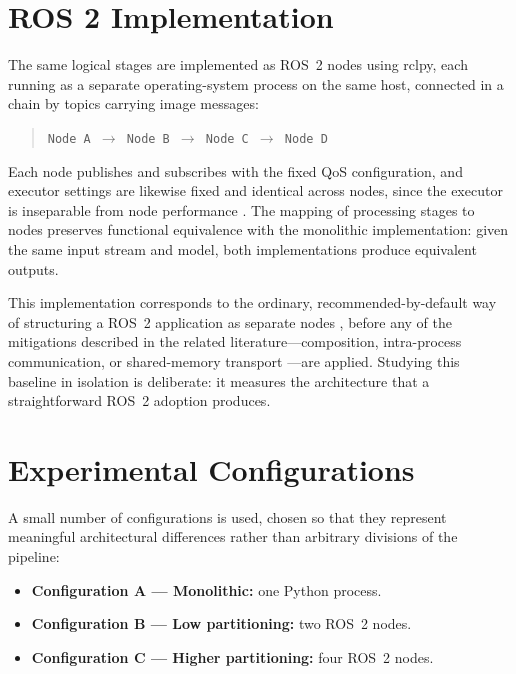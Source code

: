\section{ROS 2 Implementation}
\label{sec:ros2-implementation}

The same logical stages are implemented as ROS~2 nodes using rclpy, each
running as a separate operating-system process on the same host, connected
in a chain by topics carrying image messages:

\begin{quote}
\texttt{Node A $\rightarrow$ Node B $\rightarrow$ Node C $\rightarrow$
Node D}
\end{quote}

Each node publishes and subscribes with the fixed QoS configuration, and
executor settings are likewise fixed and identical across nodes, since
the executor is inseparable from node performance
\cite{macenski2023, casini2026}. The mapping of processing stages to
nodes preserves functional equivalence with the monolithic implementation:
given the same input stream and model, both implementations produce
equivalent outputs.

This implementation corresponds to the ordinary, recommended-by-default
way of structuring a ROS~2 application as separate nodes
\cite{macenski2022}, before any of the mitigations described in the
related literature---composition, intra-process communication, or
shared-memory transport \cite{macenski2023, kamiya2025}---are applied.
Studying this baseline in isolation is deliberate: it measures the
architecture that a straightforward ROS~2 adoption produces.

\section{Experimental Configurations}
\label{sec:configurations}

A small number of configurations is used, chosen so that they represent
meaningful architectural differences rather than arbitrary divisions of
the pipeline:

\begin{itemize}
  \item \textbf{Configuration A --- Monolithic:} one Python process.
  \item \textbf{Configuration B --- Low partitioning:} two ROS~2 nodes.
  \item \textbf{Configuration C --- Higher partitioning:} four ROS~2
        nodes.
\end{itemize}

